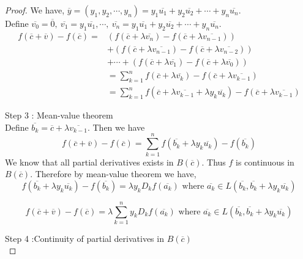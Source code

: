 \begin{proof}
	We have, $\overline{y} = (y_1, y_2, \cdots, y_n) = y_1 \overline{u_1} + y_2 \overline{u_2} + \cdots + y_n \overline{u_n}$.\\

	Define $\overline{v_0} = \overline{0},\ \overline{v_1} = y_1\overline{u_1}, \cdots, \ \overline{v_n} = y_1 \overline{u_1} + y_2 \overline{u_2} + \cdots + y_n \overline{u_n}$.
	\begin{align*}
		f(\overline{c}+\overline{v}) - f(\overline{c}) = & ( f(\overline{c}+\lambda{} \overline{v_n}) - f(\overline{c}+\lambda{} \overline{v_{n-1}}) ) \\
		& + ( f(\overline{c}+\lambda{} \overline{v_{n-1}}) - f(\overline{c}+\lambda{} \overline{v_{n-2}}) ) \\
		& + \cdots + ( f(\overline{c}+\lambda{} \overline{v_1}) - f(\overline{c}+\lambda{} \overline{v_0}) ) \\
		& = \sum_{k = 1}^n f(\overline{c} + \lambda{} \overline{v_k}) - f(\overline{c} + \lambda{} \overline{v_{k-1}}) \\
		& = \sum_{k = 1}^n f(\overline{c} + \lambda{} \overline{v_{k-1}} + \lambda{} y_k \overline{u_k}) - f(\overline{c} + \lambda{} \overline{v_{k-1}})
	\end{align*}
	\par{Step 3 :} Mean-value theorem\\
	
	Define $\overline{b_k} = \overline{c}+\lambda{}\overline{v_{k-1}}$.
	Then we have
	\begin{equation}
	f(\overline{c}+\overline{v}) - f(\overline{c}) = \sum_{k = 1}^n f(\overline{b_k} + \lambda{}y_k\overline{u_k})-f(\overline{b_k})
	\end{equation}
	We know that all partial derivatives exists in $B(\overline{c})$.
	Thus $f$ is continuous in $B(\overline{c})$.
	Therefore by mean-value theorem we have,
	\[ f(\overline{b_k}+\lambda{}y_k\overline{u_k}) - f(\overline{b_k}) = \lambda{}y_kD_kf(\overline{a_k}) \text{ where } \overline{a_k} \in L(\overline{b_k},\overline{b_k}+\lambda{}y_k\overline{u_k}) \]

	\begin{equation}
		f(\overline{c}+\overline{v}) - f(\overline{c}) = \lambda{} \sum_{k = 1}^n y_kD_kf(\overline{a_k}) \text{ where } \overline{a_k} \in L(\overline{b_k},\overline{b_k}+\lambda{}y_k\overline{u_k})
	\end{equation}
	
	\par{Step 4 :}Continuity of partial derivatives in $B(\overline{c})$\\
	

\end{proof}
